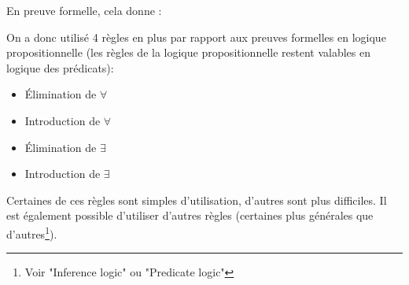 En preuve formelle, cela donne :

\begin{center}
\end{center}

On a donc utilisé 4 règles en plus par rapport aux preuves formelles en logique propositionnelle (les règles de la logique propositionnelle restent valables en logique des prédicats):
\begin{itemize}
\item Élimination de $\forall$
\item Introduction de $\forall$
\item Élimination de $\exists$
\item Introduction de $\exists$
\end{itemize}

Certaines de ces règles sont simples d'utilisation, d'autres sont plus difficiles. Il est également possible d'utiliser d'autres règles (certaines plus générales que d'autres\footnote{Voir "Inference logic" ou "Predicate logic"}).

